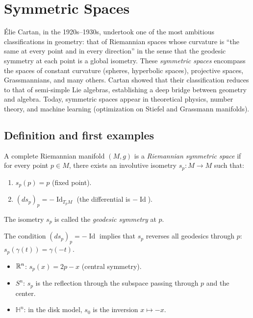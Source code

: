 \chapter{Symmetric Spaces}
\label{ch:symmetric}

\'Elie Cartan, in the 1920s--1930s, undertook one of the most ambitious classifications in geometry: that of Riemannian spaces whose curvature is ``the same at every point and in every direction'' in the sense that the geodesic symmetry at each point is a global isometry. These \emph{symmetric spaces} encompass the spaces of constant curvature (spheres, hyperbolic spaces), projective spaces, Grassmannians, and many others. Cartan showed that their classification reduces to that of semi-simple Lie algebras, establishing a deep bridge between geometry and algebra. Today, symmetric spaces appear in theoretical physics, number theory, and machine learning (optimization on Stiefel and Grassmann manifolds).

\section{Definition and first examples}

\begin{definition}
A complete Riemannian manifold $(M, g)$ is a \emph{Riemannian symmetric space}
if for every point $p \in M$, there exists an involutive isometry
$s_p : M \to M$ such that:
\begin{enumerate}
    \item $s_p(p) = p$ (fixed point).
    \item $(ds_p)_p = -\operatorname{Id}_{T_pM}$ (the differential is $-\operatorname{Id}$).
\end{enumerate}
The isometry $s_p$ is called the \emph{geodesic symmetry} at $p$.
\end{definition}

\begin{remark}
The condition $(ds_p)_p = -\operatorname{Id}$ implies that $s_p$ reverses all
geodesics through $p$: $s_p(\gamma(t)) = \gamma(-t)$.
\end{remark}

\begin{example}
\begin{itemize}
    \item $\mathbb{R}^n$: $s_p(x) = 2p - x$ (central symmetry).
    \item $S^n$: $s_p$ is the reflection through the subspace passing through
          $p$ and the center.
    \item $\mathbb{H}^n$: in the disk model, $s_0$ is the inversion $x \mapsto -x$.
\end{itemize}
\end{example}

